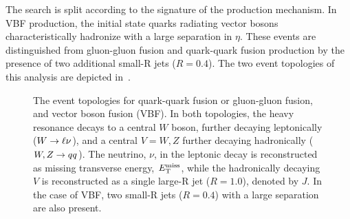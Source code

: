 The search is split according to the signature of the production mechanism. In VBF production, the initial state quarks radiating vector bosons characteristically  hadronize with a large separation in $\eta$. These events are distinguished from gluon-gluon fusion and quark-quark fusion production by the presence of two additional small-R jets ($R=0.4$). The two event topologies of this analysis are depicted in~\Fig{\ref{fig:event_topology}}.

\begin{figure}[tb]
\begin{center}
\hfill
{}
\caption[Diagram of event topologies]{The event topologies for \protect{} quark-quark fusion or gluon-gluon fusion, and \protect{} vector boson fusion (VBF). In both topologies, the heavy resonance decays to a central $W$ boson, further decaying leptonically ($W\rightarrow \ell \nu$), and a central $V=W, Z$ further decaying hadronically ($W, Z\rightarrow qq$). The neutrino, $\nu$, in the leptonic decay is reconstructed as missing transverse energy, $E_{\text{T}}^{\text{miss}}$, while the hadronically decaying $V$ is reconstructed as a single large-R jet ($R=1.0$), denoted by $J$. In the case of VBF, two small-R jets ($R=0.4$) with a large separation are also present.}
\label{fig:event_topology}
\end{center}
\end{figure}




